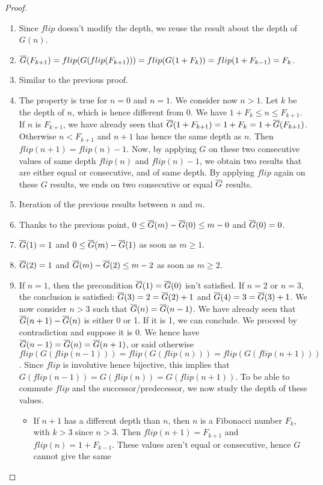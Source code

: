 \documentclass[a4paper,11pt]{article}
\begin{document}
\begin{proof}
\noindent
\begin{enumerate}
\item Since $flip$ doesn't modify the depth, we reuse the
result about the depth of $G(n)$.
\item $\overline{G}(F_{k+1}) = flip(G(flip(F_{k+1}))) = flip(G(1+F_k)) =
       flip(1+F_{k-1}) = F_k$.
\item Similar to the previous proof.
\item The property is true for $n=0$ and $n=1$.
We consider now $n>1$. Let $k$ be the depth of $n$, which is
hence different from 0. We have $1+F_k \le n \le F_{k+1}$.
If $n$ is $F_{k+1}$, we have already seen that
$\overline{G}(1+F_{k+1}) = 1+F_k = 1+\overline{G}(F_{k+1})$. Otherwise $n < F_{k+1}$
and $n+1$ has hence the same depth as $n$. Then
$flip(n+1)=flip(n)-1$. Now, by applying $G$ on these two consecutive values
of same depth $flip(n)$ and $flip(n)-1$, we obtain two results that
are either equal or consecutive, and of same depth. By applying $flip$
again on these $G$ results, we ends on two consecutive or equal 
$\overline{G}$ results.
\item Iteration of the previous results between $n$ and $m$.
\item Thanks to the previous point, $0 \le \overline{G}(m)-\overline{G}(0) \le m-0$
and $\overline{G}(0)=0$.
\item $\overline{G}(1)=1$ and $0 \le \overline{G}(m)-\overline{G}(1)$ as soon as $m\ge 1$.
\item $\overline{G}(2)=1$ and $\overline{G}(m)-\overline{G}(2) \le m-2$ as soon as $m \ge 2$.
\item If $n=1$, then the precondition $\overline{G}(1)=\overline{G}(0)$ isn't
  satisfied. If $n=2$ or $n=3$, the conclusion is satisfied:
  $\overline{G}(3)=2=\overline{G}(2)+1$ and $\overline{G}(4)=3=\overline{G}(3)+1$.
  We now consider $n>3$ such that
  $\overline{G}(n)=\overline{G}(n-1)$. We have already seen that $\overline{G}(n+1)-\overline{G}(n)$
  is either 0 or 1. If it is 1, we can conclude. We proceed by
  contradiction and suppose it is 0. We hence have
  $\overline{G}(n-1)=\overline{G}(n)=\overline{G}(n+1)$, or said otherwise
  $flip(G(flip(n-1))) = flip(G(flip(n))) = flip(G(flip(n+1)))$.
  Since $flip$ is involutive hence bijective, this implies that
  $G(flip(n-1))=G(flip(n))=G(flip(n+1))$. To be able to commute
  $flip$ and the successor/predecessor, we now study the depth
  of these values.
  \begin{itemize}
  \item If $n+1$ has a different depth than $n$, then
    $n$ is a Fibonacci number $F_k$, with $k>3$ since $n>3$.
    Then $flip(n+1)=F_{k+1}$ and $flip(n)=1+F_{k-1}$. These values
    aren't equal or consecutive, hence $G$ cannot give the same

\end{itemize}
\end{enumerate}
\end{proof}
\end{document}
